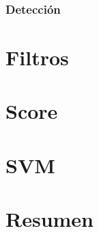 \subsubsection{Detección}

\section{Filtros}
\label{subsec:fl}

\section{Score}
\label{subsec:score}

\section{SVM}
\section{Resumen}

